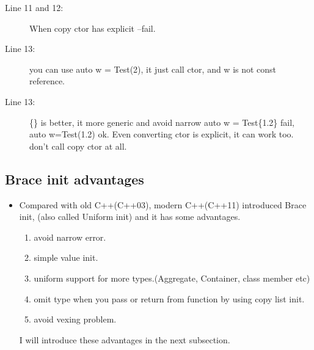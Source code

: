\documentclass[a4paper,11pt,twoside]{book}
\begin{document}
\begin{itemize}
\begin{enumerate}
\begin{description}
	\item[Line 11 and 12:] When copy ctor has explicit --fail.
	
	\item[Line 13:] you can use auto w = Test(2), it just call ctor, and w is not const reference.
	\item[Line 13:]  \{\} is better, it more generic and avoid narrow auto w = Test\{1.2\} fail, auto w=Test(1.2) ok. Even converting ctor is explicit, it can work too. don't call copy ctor at all.
\end{description}

	\end{enumerate}

\end{itemize}

\subsection{Brace init advantages}

\begin{itemize}
\item Compared with old C++(C++03), modern C++(C++11) introduced Brace init, (also called Uniform init) and it has some advantages.
\begin{enumerate}
	\item avoid narrow error.
	\item simple value init.
	\item uniform support for more types.(Aggregate, Container, class member etc)
	\item omit type when you pass or return from function by using copy list init.
	\item avoid vexing problem.
\end{enumerate}
I will introduce these advantages in the next subsection.
\end{itemize}
\end{document}
